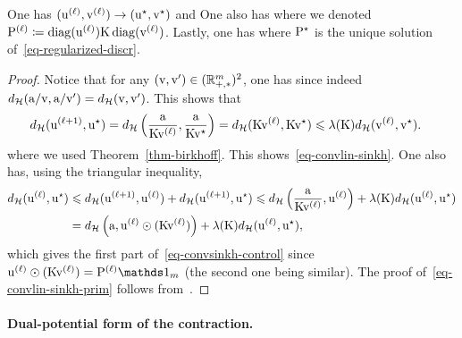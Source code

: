 \begin{thm}
	One has $(\it{\uD},\it{\vD}) \rightarrow (\uD^\star,\vD^\star)$ and
	One also has
	where we denoted $\it{\P} \eqdef \diag(\it{\uD}) \K \diag(\it{\vD})$. Lastly, one has
	\eql{\label{eq-convlin-sinkh-prim}
		\norm{\log(\it{\P}) - \log(\P^\star)}_\infty \leq \Hilbert(\it{\uD}, \uD^\star) + \Hilbert(\it{\vD}, \vD^\star)
	}
	where $\P^\star$ is the unique solution of~\eqref{eq-regularized-discr}.
\end{thm}

\begin{proof}
	Notice that for any $(\vD,\vD') \in (\RR_{+,*}^m)^2$, one has
	since indeed $\Hilbert(\a/\vD,\a/\vD') = \Hilbert(\vD,\vD')$.
	This shows that
	\begin{align*}
		\Hilbert(\itt{\uD},\uD^\star) &= \Hilbert\pa{ \frac{\a}{\K \it{\vD}}, \frac{\a}{\K \vD^\star} }
		= \Hilbert( \K \it{\vD}, \K \vD^\star ) \leq \la(\K) \Hilbert( \it{\vD}, \vD^\star ).
	\end{align*}
	where we used Theorem~\ref{thm-birkhoff}. This shows~\eqref{eq-convlin-sinkh}. One also has, using the triangular inequality,
	\begin{align*}
		\Hilbert(\it{\uD},\uD^\star) &\leq \Hilbert(\itt{\uD},\it{\uD}) + \Hilbert(\itt{\uD},\uD^\star)
		\leq \Hilbert\pa{ \frac{\a}{\K \it{\vD}},\it{\uD} } + \la(\K) \Hilbert(\it{\uD},\uD^\star) \\
		&= \Hilbert\pa{ \a,\it{\uD} \odot  ( \K \it{\vD} ) } + \la(\K) \Hilbert(\it{\uD},\uD^\star),
	\end{align*}
	which gives the first part of~\eqref{eq-convsinkh-control} since
	$\it{\uD} \odot  ( \K \it{\vD} ) = \it{\P}\ones_m$ (the second one being similar).
	The proof of~\eqref{eq-convlin-sinkh-prim} follows from~\cite[Lemma 3]{franklin1989scaling}.
\end{proof}

\paragraph{Dual-potential form of the contraction.}

